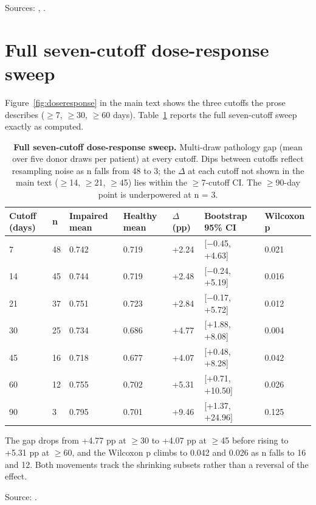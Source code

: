 \documentclass{article}
\begin{document}
Sources: , .

\section{Full seven-cutoff dose-response sweep}
\label{app:sweep}

Figure~\ref{fig:doseresponse} in the main text shows the three cutoffs the prose describes ($\geq$7, $\geq$30, $\geq$60 days). Table~\ref{tab:sweep} reports the full seven-cutoff sweep exactly as computed.

\begin{table}[h]
  \caption{\textbf{Full seven-cutoff dose-response sweep.} Multi-draw pathology gap (mean over five donor draws per patient) at every cutoff. Dips between cutoffs reflect resampling noise as n falls from 48 to 3; the $\Delta$ at each cutoff not shown in the main text ($\geq$14, $\geq$21, $\geq$45) lies within the $\geq$7-cutoff CI. The $\geq$90-day point is underpowered at n = 3.}
  \label{tab:sweep}
  \centering
  \small
  \begin{tabular}{lllllll}
    \toprule
    Cutoff (days) & n & Impaired mean & Healthy mean & $\Delta$ (pp) & Bootstrap 95\% CI & Wilcoxon p \\
    \midrule
    7 & 48 & 0.742 & 0.719 & +2.24 & [$-$0.45, +4.63] & 0.021 \\
    14 & 45 & 0.744 & 0.719 & +2.48 & [$-$0.24, +5.19] & 0.016 \\
    21 & 37 & 0.751 & 0.723 & +2.84 & [$-$0.17, +5.72] & 0.012 \\
    30 & 25 & 0.734 & 0.686 & +4.77 & [+1.88, +8.08] & 0.004 \\
    45 & 16 & 0.718 & 0.677 & +4.07 & [+0.48, +8.28] & 0.042 \\
    60 & 12 & 0.755 & 0.702 & +5.31 & [+0.71, +10.50] & 0.026 \\
    90 & 3 & 0.795 & 0.701 & +9.46 & [+1.37, +24.96] & 0.125 \\
    \bottomrule
  \end{tabular}
\end{table}

The gap drops from +4.77 pp at $\geq$30 to +4.07 pp at $\geq$45 before rising to +5.31 pp at $\geq$60, and the Wilcoxon p climbs to 0.042 and 0.026 as n falls to 16 and 12. Both movements track the shrinking subsets rather than a reversal of the effect.

Source: .
\end{document}
